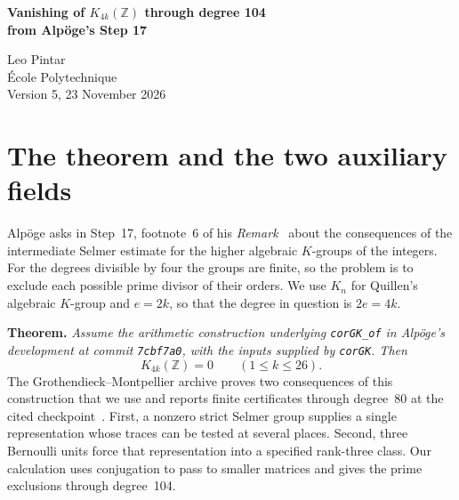 \documentclass[11pt,a4paper]{article}
\newcommand{\Z}{\mathbb Z}
\begin{document}
\begin{center}
{\LARGE\bfseries Vanishing of \(K_{4k}(\Z)\) through degree 104\\[3pt]from Alpöge's Step 17\par}
\vspace{7pt}
{\large Leo Pintar}\\[2pt]
École Polytechnique\\[2pt]
Version 5, 23 November 2026
\end{center}
\begin{abstract}
Assuming the arithmetic construction in Alpöge's Step~17, we prove that \(K_{4k}(\Z)=0\) for \(1\le k\le26\). We identify the rational strict Selmer group detected by Step~17 and use the Grothendieck--Montpellier joint representation theorem and Bernoulli criterion to reduce vanishing to integral Hecke tests. In degree 104 the Bernoulli criterion selects four large primes for the second auxiliary field. Two rank-324 determinants exclude all other large primes in the first field. A rank-2,925 determinant is a unit at all four in the second. The accompanying certificates cover every lower multiple of four.
\end{abstract}
\section{The theorem and the two auxiliary fields}
Alpöge asks in Step~17, footnote~6 of his \emph{Remark}~\cite{alpoge} about the consequences of the intermediate Selmer estimate for the higher algebraic \(K\)-groups of the integers. For the degrees divisible by four the groups are finite, so the problem is to exclude each possible prime divisor of their orders. We use \(K_n\) for Quillen's algebraic \(K\)-group and \(e=2k\), so that the degree in question is \(2e=4k\).
\par\medskip
\noindent\textbf{Theorem.} \emph{Assume the arithmetic construction underlying \texttt{corGK\_of} in Alpöge's development at commit \texttt{7cbf7a0}, with the inputs supplied by \texttt{corGK}. Then}
\[
             K_{4k}(\Z)=0 \qquad (1\leq k\leq 26).
\]
The Grothendieck--Montpellier archive proves two consequences of this construction that we use and reports finite certificates through degree~80 at the cited checkpoint~\cite{ktower}. First, a nonzero strict Selmer group supplies a single representation whose traces can be tested at several places. Second, three Bernoulli units force that representation into a specified rank-three class. Our calculation uses conjugation to pass to smaller matrices and gives the prime exclusions through degree~104.
\end{document}
